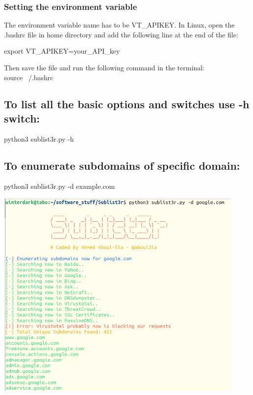 \documentclass[12pt]{article}
\begin{document}
\subsubsection{Setting the environment variable}\label{subsubsec:setting-the-environment-variable}
The environment variable name has to be VT\_APIKEY. In Linux, open the .bashrc file in home directory and add the following line at the end of the file:

export VT\_APIKEY=your\_API\_key

Then save the file and run the following command in the terminal:\\
source ~/.bashrc

\subsection{To list all the basic options and switches use -h switch:}\label{subsec:to-list-all-the-basic-options-and-switches-use-h-switch}
python3 sublist3r.py -h

\subsection{To enumerate subdomains of specific domain:}\label{subsec:to-enumerate-subdomains-of-specific-domain}
python3 sublist3r.py -d example.com

\begin{center}
    \includegraphics[max width=\textwidth]{Image1.png}
\end{center}
\end{document}
